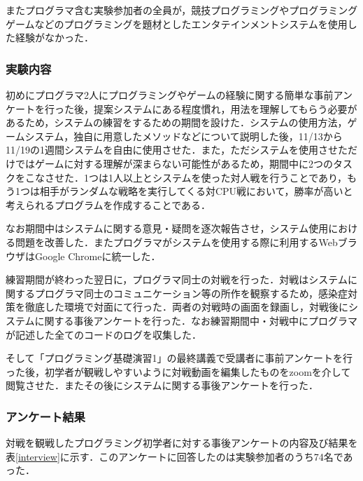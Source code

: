 またプログラマ含む実験参加者の全員が，競技プログラミングやプログラミングゲームなどのプログラミングを題材としたエンタテインメントシステムを使用した経験がなかった．

\subsubsection{実験内容}

初めにプログラマ2人にプログラミングやゲームの経験に関する簡単な事前アンケートを行った後，提案システムにある程度慣れ，用法を理解してもらう必要があるため，システムの練習をするための期間を設けた．システムの使用方法，ゲームシステム，独自に用意したメソッドなどについて説明した後，11/13から11/19の1週間システムを自由に使用させた．また，ただシステムを使用させただけではゲームに対する理解が深まらない可能性があるため，期間中に2つのタスクをこなさせた．1つは1人以上とシステムを使った対人戦を行うことであり，もう1つは相手がランダムな戦略を実行してくる対CPU戦において，勝率が高いと考えられるプログラムを作成することである．

なお期間中はシステムに関する意見・疑問を逐次報告させ，システム使用における問題を改善した．またプログラマがシステムを使用する際に利用するWebブラウザはGoogle Chromeに統一した．

練習期間が終わった翌日に，プログラマ同士の対戦を行った．対戦はシステムに関するプログラマ同士のコミュニケーション等の所作を観察するため，感染症対策を徹底した環境で対面にて行った．両者の対戦時の画面を録画し，対戦後にシステムに関する事後アンケートを行った．なお練習期間中・対戦中にプログラマが記述した全てのコードのログを収集した．

そして「プログラミング基礎演習1」の最終講義で受講者に事前アンケートを行った後，初学者が観戦しやすいように対戦動画を編集したものをzoomを介して閲覧させた．またその後にシステムに関する事後アンケートを行った．

\subsubsection{アンケート結果}

対戦を観戦したプログラミング初学者に対する事後アンケートの内容及び結果を表\ref{interview}に示す．このアンケートに回答したのは実験参加者のうち74名であった．

